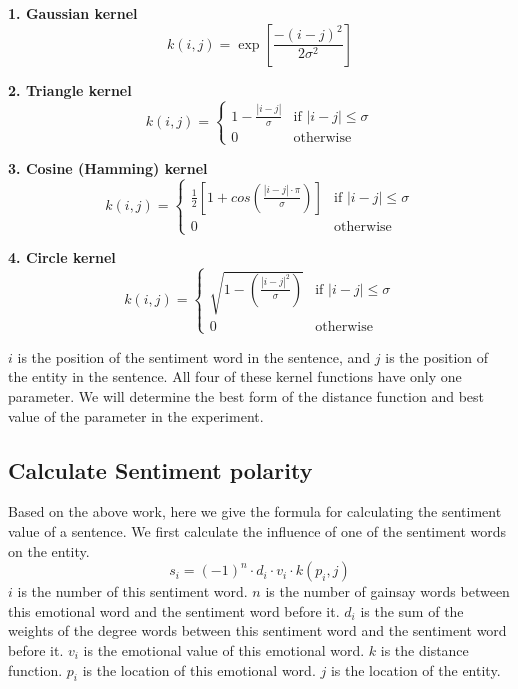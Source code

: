\documentclass[runningheads]{llncs}
\begin{document}
\textbf{1. Gaussian kernel}
\begin{equation}
    k(i,j) = \exp\left[\frac{-(i-j)^2}{2\sigma^2}\right]
\end{equation}

\textbf{2. Triangle kernel}
\begin{equation}
k(i,j)=\begin{cases}
1-\frac{|i-j|}{\sigma} &\mbox{if $|i-j|\leq \sigma$}\\
0 &\mbox{otherwise}
\end{cases}
\end{equation}

\textbf{3. Cosine (Hamming) kernel}
\begin{equation}
k(i,j)=\begin{cases}
\frac{1}{2}\left[1+cos\left(\frac{|i-j|\cdot\pi}{\sigma}\right)\right] &\mbox{if $|i-j|\leq \sigma$}\\
0 &\mbox{otherwise}
\end{cases}
\end{equation}

\textbf{4. Circle kernel}
\begin{equation}
k(i,j)=\begin{cases}
\sqrt{1-\left(\frac{|i-j|^2}{\sigma}\right)} &\mbox{if $|i-j|\leq \sigma$}\\
0 &\mbox{otherwise}
\end{cases}
\end{equation}

$i$ is the position of the sentiment word in the sentence, and $j$ is the position of the entity in the sentence. All four of these kernel functions have only one parameter. We will determine the best form of the distance function and best value of the parameter in the experiment.

\subsection{Calculate Sentiment polarity}
Based on the above work, here we give the formula for calculating the sentiment value of a sentence. We first calculate the influence of one of the sentiment words on the entity.
\begin{equation}
    s_i = (-1)^n\cdot d_i\cdot v_i\cdot k(p_i,j)
\end{equation}
$i$ is the number of this sentiment word. $n$ is the number of gainsay words between this emotional word and the sentiment word before it. $d_i$ is the sum of the weights of the degree words between this sentiment word and the sentiment word before it. $v_i$ is the emotional value of this emotional word. $k$ is the distance function. $p_i$ is the location of this emotional word. $j$ is the location of the entity.
\end{document}
